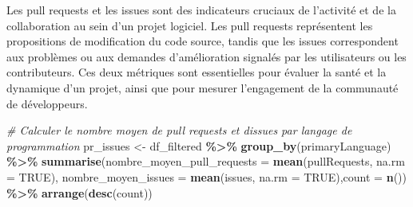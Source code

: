 \documentclass[
]{article}
\newenvironment{Shaded}{\begin{snugshade}}{\end{snugshade}}
\newcommand{\AttributeTok}[1]{\textcolor[rgb]{0.13,0.29,0.53}{#1}}
\newcommand{\CommentTok}[1]{\textcolor[rgb]{0.56,0.35,0.01}{\textit{#1}}}
\newcommand{\ConstantTok}[1]{\textcolor[rgb]{0.56,0.35,0.01}{#1}}
\newcommand{\FunctionTok}[1]{\textcolor[rgb]{0.13,0.29,0.53}{\textbf{#1}}}
\newcommand{\NormalTok}[1]{#1}
\newcommand{\OtherTok}[1]{\textcolor[rgb]{0.56,0.35,0.01}{#1}}
\newcommand{\SpecialCharTok}[1]{\textcolor[rgb]{0.81,0.36,0.00}{\textbf{#1}}}
\begin{document}
Les pull requests et les issues sont des indicateurs cruciaux de
l'activité et de la collaboration au sein d'un projet logiciel. Les pull
requests représentent les propositions de modification du code source,
tandis que les issues correspondent aux problèmes ou aux demandes
d'amélioration signalés par les utilisateurs ou les contributeurs. Ces
deux métriques sont essentielles pour évaluer la santé et la dynamique
d'un projet, ainsi que pour mesurer l'engagement de la communauté de
développeurs.

\begin{Shaded}
\begin{Highlighting}[]
\CommentTok{\# Calculer le nombre moyen de pull requests et d\textquotesingle{}issues par langage de programmation}
\NormalTok{pr\_issues }\OtherTok{\textless{}{-}}\NormalTok{ df\_filtered }\SpecialCharTok{\%\textgreater{}\%}
  \FunctionTok{group\_by}\NormalTok{(primaryLanguage) }\SpecialCharTok{\%\textgreater{}\%}
  \FunctionTok{summarise}\NormalTok{(}\AttributeTok{nombre\_moyen\_pull\_requests =} \FunctionTok{mean}\NormalTok{(pullRequests, }\AttributeTok{na.rm =} \ConstantTok{TRUE}\NormalTok{),}
            \AttributeTok{nombre\_moyen\_issues =} \FunctionTok{mean}\NormalTok{(issues, }\AttributeTok{na.rm =} \ConstantTok{TRUE}\NormalTok{),}\AttributeTok{count =} \FunctionTok{n}\NormalTok{()) }\SpecialCharTok{\%\textgreater{}\%}
  \FunctionTok{arrange}\NormalTok{(}\FunctionTok{desc}\NormalTok{(count))}


\end{Highlighting}
\end{Shaded}
\end{document}
